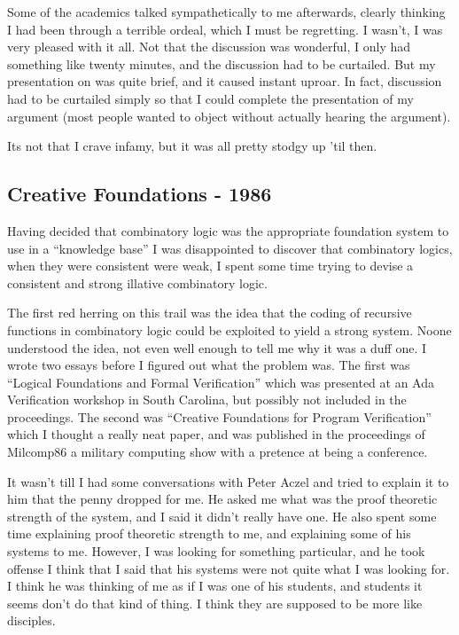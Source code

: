 \documentclass{rbjk}
\begin{document}
\begin{article}
Some of the academics talked sympathetically to me afterwards, clearly thinking I had been through a terrible ordeal, which I must be regretting.
I wasn't, I was very pleased with it all.
Not that the discussion was wonderful, I only had something like twenty minutes, and the discussion had to be curtailed.
But my presentation on was quite brief, and it caused instant uproar.
In fact, discussion had to be curtailed simply so that I could complete the presentation of my argument (most people wanted to object without actually hearing the argument).

Its not that I crave infamy, but it was all pretty stodgy up 'til then.

\subsection{Creative Foundations - 1986}

Having decided that combinatory logic was the appropriate foundation system to use in a ``knowledge base'' I was disappointed to discover that combinatory logics, when they were consistent were weak, I spent
some time trying to devise a consistent and strong illative combinatory logic.

The first red herring on this trail was the idea that the coding of recursive functions in combinatory logic could be exploited to yield a strong system.
Noone understood the idea, not even well enough to tell me why it was a duff one.
I wrote two essays before I figured out what the problem was.
The first was ``Logical Foundations and Formal Verification'' which was presented at an Ada Verification workshop in South Carolina, but possibly not included in the proceedings.
The second was ``Creative Foundations for Program Verification'' which I thought a really neat paper, and was published in the proceedings of Milcomp86 a military computing show with a pretence at being a conference.

It wasn't till I had some conversations with Peter Aczel and tried to explain it to him that the penny dropped for me.
He asked me what was the proof theoretic strength of the system, and I said it didn't really have one.
He also spent some time explaining proof theoretic strength to me, and explaining some of his systems to me.
However, I was looking for something particular, and he took offense I think that I said that his systems were not quite what I was looking for.
I think he was thinking of me as if I was one of his students, and students it seems don't do that kind of thing.
I think they are supposed to be more like disciples.


\end{article}
\end{document}
